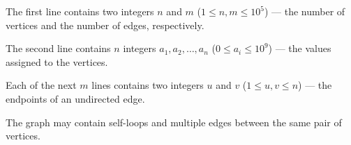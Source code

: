 The first line contains two integers $n$ and $m$ ($1 \le n, m \le 10^5$) --- the number of vertices and the number of edges, respectively.

The second line contains $n$ integers $a_1, a_2, \ldots, a_n$ ($0 \le a_i \le 10^9$) --- the values assigned to the vertices.

Each of the next $m$ lines contains two integers $u$ and $v$ ($1 \le u, v \le n$) --- the endpoints of an undirected edge.

The graph may contain self-loops and multiple edges between the same pair of vertices.